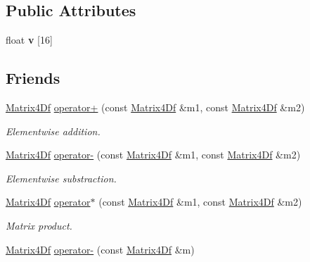 \subsection*{\-Public \-Attributes}
\begin{DoxyCompactItemize}
\item 
\hypertarget{class_matrix4_df_a6ab3777076d9cf39f46adf2a8c1f404e}{
float {\bfseries v} \mbox{[}16\mbox{]}}
\label{class_matrix4_df_a6ab3777076d9cf39f46adf2a8c1f404e}

\end{DoxyCompactItemize}
\subsection*{\-Friends}
\begin{DoxyCompactItemize}
\item 
\hypertarget{class_matrix4_df_aa8b49e6b5d204995a97bdcdff56e1ff8}{
\hyperlink{class_matrix4_df}{\-Matrix4\-Df} \hyperlink{class_matrix4_df_aa8b49e6b5d204995a97bdcdff56e1ff8}{operator+} (const \hyperlink{class_matrix4_df}{\-Matrix4\-Df} \&m1, const \hyperlink{class_matrix4_df}{\-Matrix4\-Df} \&m2)}
\label{class_matrix4_df_aa8b49e6b5d204995a97bdcdff56e1ff8}

\begin{DoxyCompactList}\small\item\em \-Elementwise addition. \end{DoxyCompactList}\item 
\hypertarget{class_matrix4_df_a4cd11065198b040b1bc3e3026835b368}{
\hyperlink{class_matrix4_df}{\-Matrix4\-Df} \hyperlink{class_matrix4_df_a4cd11065198b040b1bc3e3026835b368}{operator-\/} (const \hyperlink{class_matrix4_df}{\-Matrix4\-Df} \&m1, const \hyperlink{class_matrix4_df}{\-Matrix4\-Df} \&m2)}
\label{class_matrix4_df_a4cd11065198b040b1bc3e3026835b368}

\begin{DoxyCompactList}\small\item\em \-Elementwise substraction. \end{DoxyCompactList}\item 
\hypertarget{class_matrix4_df_ac4aad75706ee141200622ba4c5b59aae}{
\hyperlink{class_matrix4_df}{\-Matrix4\-Df} \hyperlink{class_matrix4_df_ac4aad75706ee141200622ba4c5b59aae}{operator$\ast$} (const \hyperlink{class_matrix4_df}{\-Matrix4\-Df} \&m1, const \hyperlink{class_matrix4_df}{\-Matrix4\-Df} \&m2)}
\label{class_matrix4_df_ac4aad75706ee141200622ba4c5b59aae}

\begin{DoxyCompactList}\small\item\em \-Matrix product. \end{DoxyCompactList}\item 
\hypertarget{class_matrix4_df_a6e845817f2128ac90102744e21e98a27}{
\hyperlink{class_matrix4_df}{\-Matrix4\-Df} \hyperlink{class_matrix4_df_a6e845817f2128ac90102744e21e98a27}{operator-\/} (const \hyperlink{class_matrix4_df}{\-Matrix4\-Df} \&m)}
\label{class_matrix4_df_a6e845817f2128ac90102744e21e98a27}


\end{DoxyCompactItemize}
